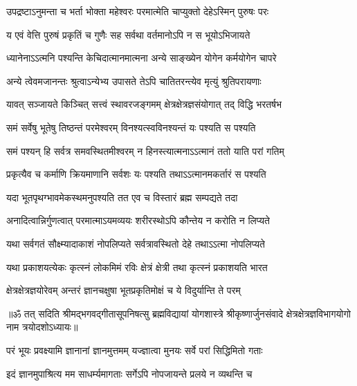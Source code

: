 \twolineshloka
{उपद्रष्टाऽनुमन्ता च भर्ता भोक्ता महेश्वरः}
{परमात्मेति चाप्युक्तो देहेऽस्मिन् पुरुषः परः}%

\twolineshloka
{य एवं वेत्ति पुरुषं प्रकृतिं च गुणैः सह}
{सर्वथा वर्तमानोऽपि न स भूयोऽभिजायते}%

\twolineshloka
{ध्यानेनाऽऽत्मनि पश्यन्ति केचिदात्मानमात्मना}
{अन्ये साङ्ख्येन योगेन कर्मयोगेन चापरे}%

\twolineshloka
{अन्ये त्वेवमजानन्तः श्रुत्वाऽन्येभ्य उपासते}
{तेऽपि चातितरन्त्येव मृत्युं श्रुतिपरायणाः}%

\twolineshloka
{यावत् सञ्जायते किञ्चित् सत्त्वं स्थावरजङ्गमम्}
{क्षेत्रक्षेत्रज्ञसंयोगात् तद् विद्धि भरतर्षभ}%

\twolineshloka
{समं सर्वेषु भूतेषु तिष्ठन्तं परमेश्वरम्}
{विनश्यत्स्वविनश्यन्तं यः पश्यति स पश्यति}%

\twolineshloka
{समं पश्यन् हि सर्वत्र समवस्थितमीश्वरम्}
{न हिनस्त्यात्मनाऽऽत्मानं ततो याति परां गतिम्}%

\twolineshloka
{प्रकृत्यैव च कर्माणि क्रियमाणानि सर्वशः}
{यः पश्यति तथाऽऽत्मानमकर्तारं स पश्यति}%

\twolineshloka
{यदा भूतपृथग्भावमेकस्थमनुपश्यति}
{तत एव च विस्तारं ब्रह्म सम्पद्यते तदा}%

\twolineshloka
{अनादित्वान्निर्गुणत्वात् परमात्माऽयमव्ययः}
{शरीरस्थोऽपि कौन्तेय न करोति न लिप्यते}%

\twolineshloka
{यथा सर्वगतं सौक्ष्म्यादाकाशं नोपलिप्यते}
{सर्वत्रावस्थितो देहे तथाऽऽत्मा नोपलिप्यते}%

\twolineshloka
{यथा प्रकाशयत्येकः कृत्स्नं लोकमिमं रविः}
{क्षेत्रं क्षेत्री तथा कृत्स्नं प्रकाशयति भारत}%

\twolineshloka
{क्षेत्रक्षेत्रज्ञयोरेवम् अन्तरं ज्ञानचक्षुषा}
{भूतप्रकृतिमोक्षं च ये विदुर्यान्ति ते परम्}%

{॥ॐ तत् सदिति श्रीमद्भगवद्गीतासूपनिषत्सु ब्रह्मविद्यायां योगशास्त्रे श्रीकृष्णार्जुनसंवादे क्षेत्रक्षेत्रज्ञविभागयोगो नाम त्रयोदशोऽध्यायः॥}



\twolineshloka
{परं भूयः प्रवक्ष्यामि ज्ञानानां ज्ञानमुत्तमम्}
{यज्ज्ञात्वा मुनयः सर्वे परां सिद्धिमितो गताः}%

\twolineshloka
{इदं ज्ञानमुपाश्रित्य मम साधर्म्यमागताः}
{सर्गेऽपि नोपजायन्ते प्रलये न व्यथन्ति च}%

